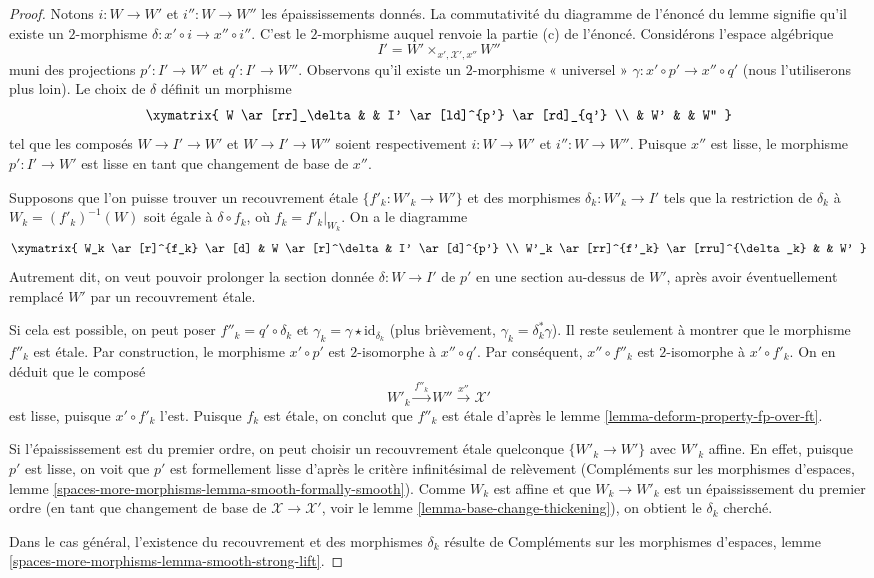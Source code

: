 \begin{proof}
Notons $i : W \to W'$ et $i'' : W \to W''$ les épaississements donnés.
La commutativité du diagramme de l'énoncé du lemme
signifie qu'il existe un $2$-morphisme $\delta : x' \circ i \to x'' \circ i''$.
C'est le $2$-morphisme auquel renvoie la partie (c) de l'énoncé.
Considérons l'espace algébrique
$$
I' = W' \times_{x', \mathcal{X}', x''} W''
$$
muni des projections $p' : I' \to W'$ et $q' : I' \to W''$.
Observons qu'il existe un $2$-morphisme « universel »
$\gamma : x' \circ p' \to x'' \circ q'$ (nous l'utiliserons plus loin).
Le choix de $\delta$ définit un morphisme
$$
\xymatrix{
W \ar[rr]_\delta & & I' \ar[ld]^{p'} \ar[rd]_{q'} \\
& W' & & W''
}
$$
tel que les composés $W \to I' \to W'$ et $W \to I' \to W''$
soient respectivement $i : W \to W'$ et $i'' : W \to W''$.
Puisque $x''$ est lisse, le morphisme $p' : I' \to W'$ est lisse
en tant que changement de base de $x''$.

\medskip\noindent
Supposons que l'on puisse trouver un recouvrement \'etale $\{f'_k : W'_k \to W'\}$
et des morphismes $\delta_k : W'_k \to I'$ tels que la restriction
de $\delta_k$ à $W_k = (f'_k)^{-1}(W)$ soit égale à $\delta \circ f_k$,
où $f_k = f'_k|_{W_k}$. On a le diagramme
$$
\xymatrix{
W_k \ar[r]^{f_k} \ar[d] & W \ar[r]^\delta & I' \ar[d]^{p'} \\
W'_k \ar[rr]^{f'_k} \ar[rru]^{\delta_k} & & W'
}
$$
Autrement dit, on veut pouvoir prolonger la section donnée
$\delta : W \to I'$ de $p'$ en une section au-dessus de $W'$, après avoir éventuellement
remplacé $W'$ par un recouvrement \'etale.

\medskip\noindent
Si cela est possible, on peut poser $f''_k = q' \circ \delta_k$
et $\gamma_k = \gamma \star \text{id}_{\delta_k}$ (plus brièvement,
$\gamma_k = \delta_k^*\gamma$). Il reste seulement à montrer
que le morphisme $f''_k$ est \'etale.
Par construction, le morphisme $x' \circ p'$ est $2$-isomorphe
à $x'' \circ q'$. Par conséquent, $x'' \circ f''_k$ est $2$-isomorphe
à $x' \circ f'_k$. On en déduit que le composé
$$
W'_k \xrightarrow{f''_k} W'' \xrightarrow{x''} \mathcal{X}'
$$
est lisse, puisque $x' \circ f'_k$ l'est.
Puisque $f_k$ est \'etale, on conclut que $f''_k$ est \'etale
d'après le lemme \ref{lemma-deform-property-fp-over-ft}.

\medskip\noindent
Si l'épaississement est du premier ordre, on peut
choisir un recouvrement \'etale quelconque $\{W'_k \to W'\}$ avec $W'_k$ affine.
En effet, puisque $p'$ est lisse, on voit que $p'$ est formellement lisse d'après le
critère infinitésimal de relèvement (Compléments sur les morphismes d'espaces, lemme
\ref{spaces-more-morphisms-lemma-smooth-formally-smooth}).
Comme $W_k$ est affine et que $W_k \to W'_k$ est un épaississement du premier ordre
(en tant que changement de base de $\mathcal{X} \to \mathcal{X}'$, voir
le lemme \ref{lemma-base-change-thickening}), on obtient le $\delta_k$
cherché.

\medskip\noindent
Dans le cas général, l'existence du recouvrement et des morphismes
$\delta_k$ résulte de Compléments sur les morphismes d'espaces, lemme
\ref{spaces-more-morphisms-lemma-smooth-strong-lift}.
\end{proof}

